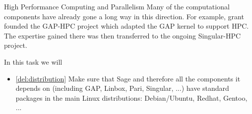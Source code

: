 \begin{Workpackage}{\thewpno}
\begin{task}{High Performance Computing and Parallelism}
    Many of the computational components have already gone a long way
    in this direction. For example, grant  founded the
    GAP-HPC project which adapted the GAP kernel to support HPC. The
    expertise gained there was then transferred to the ongoing
    Singular-HPC project.

    In this task we will 

  \end{task}

  \begin{WPDeliverables}
    \begin{itemize}



    \item \ref{del:distribution} Make sure that Sage and therefore all the
      components it depends on (including GAP, Linbox, Pari, Singular,
      ...)  have standard packages in the main Linux distributions:
      Debian/Ubuntu, Redhat, Gentoo, ...



\end{itemize}
\end{WPDeliverables}
\end{Workpackage}
